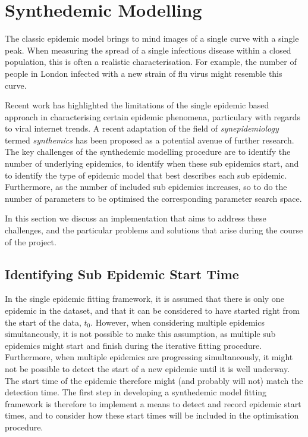 \chapter{Synthedemic Modelling}
\label{ch:multi}
The classic epidemic model brings to mind images of a single curve
with a single peak. When measuring the spread of a single infectious
disease within a closed population, this is often a realistic
characterisation. For example, the number of people in London infected
with a new strain of flu virus might resemble this curve. 

Recent work has highlighted the limitations of the single epidemic
based approach in characterising certain epidemic phenomena, particulary with
regards to viral internet trends.\cite{marily2013, marily2014} A
recent adaptation of the field of \emph{synepidemiology} termed
\emph{synthemics} has been proposed as a potential avenue of further
research. The key challenges of the synthedemic modelling procedure are to
identify the number of underlying epidemics, to identify when these
sub epidemics start, and to identify the type of epidemic model that
best describes each sub epidemic. Furthermore, as the number of
included sub epidemics increases, so to do the number of parameters to
be optimised the corresponding parameter search space. 

In this section we discuss an implementation that aims to address these challenges,
and the particular problems and solutions that arise during the course
of the project.


\section{Identifying Sub Epidemic Start Time}
In the single epidemic fitting framework, it is assumed that there is
only one epidemic in the dataset, and that it can be considered to
have started right from the start of the data, $t_0$. However, when
considering multiple epidemics simultaneously, it is not possible to
make this assumption, as multiple sub epidemics might start and finish during
the iterative fitting procedure. Furthermore, when multiple epidemics
are progressing simultaneously, it might not be possible to detect the
start of a new epidemic until it is well underway. The start time of
the epidemic therefore might (and probably will not) match the
detection time. The first step in developing a
synthedemic model fitting framework is therefore to implement a means
to detect and record epidemic start times, and to consider how these
start times will be included in the optimisation procedure.

